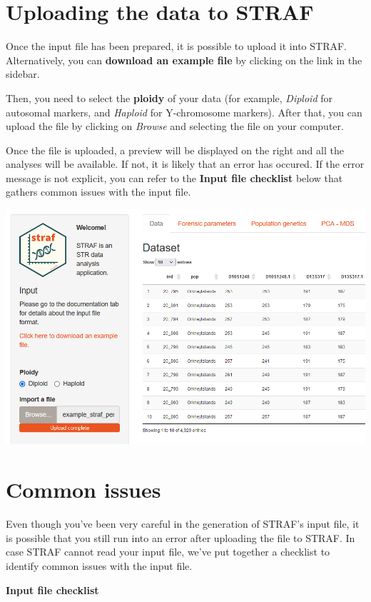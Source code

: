 \documentclass[
]{book}
\begin{document}
\hypertarget{uploading-the-data-to-straf}{%
\section{Uploading the data to STRAF}\label{uploading-the-data-to-straf}}

Once the input file has been prepared, it is possible to upload it into STRAF. Alternatively,
you can \textbf{download an example file} by clicking on the link in the sidebar.

Then, you need to select the \textbf{ploidy} of your data (for example, \emph{Diploid} for
autosomal markers, and \emph{Haploid} for Y-chromosome markers). After that, you can
upload the file by clicking on \emph{Browse} and selecting the file on your computer.

Once the file is uploaded, a preview will be displayed on the right and all the
analyses will be available. If not, it is likely that an error has occured. If the error
message is not explicit, you can refer to the \textbf{Input file checklist} below that
gathers common issues with the input file.

\includegraphics[width=0.8\linewidth]{img/capture_import_1}

\hypertarget{common-issues}{%
\section{Common issues}\label{common-issues}}

Even though you've been very careful in the generation of STRAF's input file,
it is possible that you still run into an error after uploading the file to STRAF.
In case STRAF cannot read your input file, we've put together a checklist to identify
common issues with the input file.

\textbf{Input file checklist}
\end{document}
